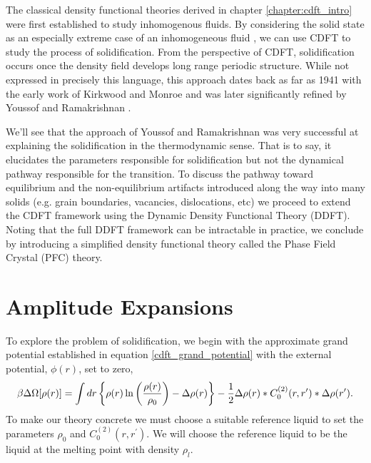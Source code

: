 \label{chapter:cdft_of_freezing}

The classical density functional theories derived in chapter
\ref{chapter:cdft_intro} were first established to study inhomogenous fluids.
By considering the solid state as an especially extreme case of an
inhomogeneous fluid \cite{HANSEN-CH6}, we can use CDFT to study the process of
solidification. From the perspective of CDFT, solidification occurs once the
density field develops long range periodic structure.  While not expressed in
precisely this language, this approach dates back as far as 1941 with the early
work of Kirkwood and Monroe \cite{KIRKWOOD_MONROE41} and was later
significantly refined by Youssof and Ramakrishnan \cite{RAMAKRISHNAN79}.

We'll see that the approach of Youssof and Ramakrishnan was very successful at
explaining the solidification in the thermodynamic sense. That is to say, it
elucidates the parameters responsible for solidification but not the dynamical
pathway responsible for the transition. To discuss the pathway toward  equilibrium
and the non-equilibrium artifacts introduced along the way into many solids (e.g. grain
boundaries, vacancies, dislocations, etc) we proceed to extend the CDFT
framework using the Dynamic Density Functional Theory (DDFT). Noting that the
full DDFT framework can be intractable in practice, we conclude by introducing a
simplified density functional theory called the Phase Field Crystal (PFC)
theory.

\section{Amplitude Expansions} %

To explore the problem of solidification, we begin with the approximate grand
potential established in equation \ref{cdft_grand_potential} with the external
potential, $\phi(r)$, set to zero,
%
\begin{equation}
    \beta \Delta \Omega[\rho(r)] =
        \int dr \left\lbrace 
            \rho(r)\ln\left(\frac{\rho(r)}{\rho_0}\right) - \Delta\rho(r)\right\rbrace
        - \frac{1}{2} \Delta\rho(r) \ast C^{(2)}_0(r, r^\prime)
            \ast \Delta\rho(r^\prime).
\end{equation}
%
To make our theory concrete we must choose a suitable reference liquid to set
the parameters $\rho_0$ and $C^{(2)}_0(r, r^\prime)$. We will choose the
reference liquid to be the liquid at the melting point with density $\rho_l$.

